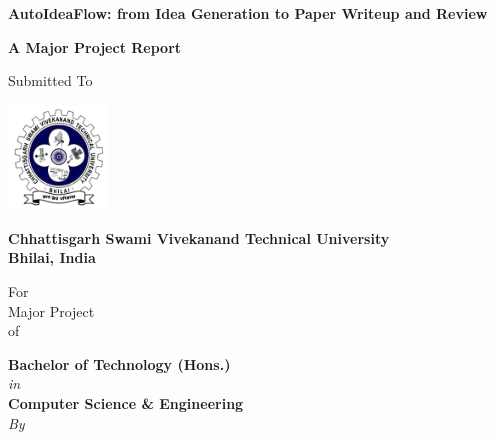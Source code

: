 \begin{titlepage}
  \centering
  
  {\Huge\bfseries AutoIdeaFlow: from Idea Generation to Paper Writeup and Review\par}
  \vspace{0.5cm}
  
  {\Large\textbf{A Major Project Report}\par}
  
  {\Large Submitted To\par}
  \vspace{0.4cm}
  
  \includegraphics[width=0.2\textwidth]{images/logo.png}\par
  
  {\Large\textbf{Chhattisgarh Swami Vivekanand Technical University\\Bhilai, India}\par}
  
  \large For \\ Major Project \\ of \par
  
  \textbf{Bachelor of Technology (Hons.)} \\\textit{in} \\\textbf{Computer Science \& Engineering} \\\textit{By}\par
  \vspace{0.5cm}
  

\end{titlepage}
